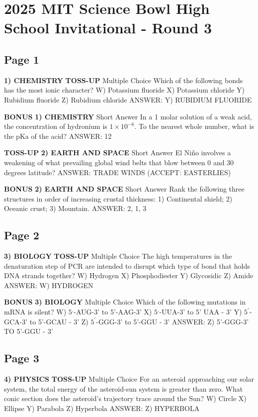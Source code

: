 \documentclass{article}
\begin{document}
\section*{2025 MIT Science Bowl High School Invitational - Round 3}

\subsection*{Page 1}
\textbf{1) CHEMISTRY}
\textbf{TOSS-UP}
Multiple Choice Which of the following bonds has the most ionic character?
W) Potassium fluoride
X) Potassium chloride
Y) Rubidium fluoride
Z) Rubidium chloride
ANSWER: Y) RUBIDIUM FLUORIDE

\textbf{BONUS}
\textbf{1) CHEMISTRY}
Short Answer In a 1 molar solution of a weak acid, the concentration of hydronium is $1\times10^{-6}$. To the nearest whole number, what is the pKa of the acid?
ANSWER: 12

\textbf{TOSS-UP}
\textbf{2) EARTH AND SPACE}
Short Answer El Niño involves a weakening of what prevailing global wind belts that blow between 0 and 30 degrees latitude?
ANSWER: TRADE WINDS (ACCEPT: EASTERLIES)

\textbf{BONUS}
\textbf{2) EARTH AND SPACE}
Short Answer Rank the following three structures in order of increasing crustal thickness: 1) Continental shield; 2) Oceanic crust; 3) Mountain.
ANSWER: 2, 1, 3

\subsection*{Page 2}
\textbf{3) BIOLOGY}
\textbf{TOSS-UP}
Multiple Choice The high temperatures in the denaturation step of PCR are intended to disrupt which type of bond that holds DNA strands together?
W) Hydrogen
X) Phosphodiester
Y) Glycosidic
Z) Amide
ANSWER: W) HYDROGEN

\textbf{BONUS}
\textbf{3) BIOLOGY}
Multiple Choice Which of the following mutations in mRNA is silent?
W) $5^{,}$-AUG-3' to 5'-AAG-3'
X) $5^{,}$-UUA-3' to 5' UAA - 3'
Y) $5^{\prime}$-GCA-3' to 5'-GCAU - 3'
Z) $5^{\prime}$-GGG-3' to 5'-GGU - 3'
ANSWER: Z) 5'-GGG-3' TO 5'-GGU - 3'

\subsection*{Page 3}
\textbf{4) PHYSICS}
\textbf{TOSS-UP}
Multiple Choice For an asteroid approaching our solar system, the total energy of the asteroid-sun system is greater than zero. What conic section does the asteroid's trajectory trace around the Sun?
W) Circle
X) Ellipse
Y) Parabola
Z) Hyperbola
ANSWER: Z) HYPERBOLA
\end{document}
